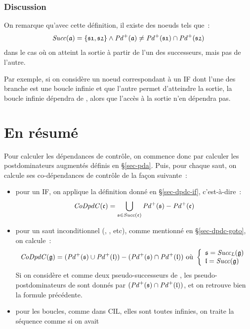 \subsubsection{Discussion}

On remarque qu'avec cette définition, il existe des noeuds  tels que~:
$$
\mathit{Succ}(\mathfrak{a}) = \{\mathfrak{s1}, \mathfrak{s2}\} \wedge \mathit{Pd}^{+}(\mathfrak{a}) \neq \mathit{Pd}^{+}(\mathfrak{s1}) \cap \mathit{Pd}^{+}(\mathfrak{s2})
$$
dans le cas où on atteint la sortie à partir de l'un des successeurs, mais pas
de l'autre.

Par exemple, si on considère un noeud  correspondant à un {\sc IF}
dont l'une des branche est une boucle infinie et que l'autre permet d'atteindre
la sortie, la boucle infinie dépendra de , alors que l'accès à la sortie
n'en dépendra pas.


\section{En résumé}

Pour calculer les dépendances de contrôle, on commence donc par calculer les
postdominateurs augmentés définis en \S\ref{sec-pda}.
Puis, pour chaque saut, on calcule ses co-dépendances de contrôle de la façon
suivante~:

\begin{itemize}
  \item pour un {\sc IF},
    on applique la définition donné en \S\ref{sec-dpdc-if},
    c'est-à-dire~:
$$
\mathit{CoDpdC}(\mathfrak{c}) = \bigcup_{ \mathfrak{s} \in \mathit{Succ}(\mathfrak{c})} \mathit{Pd}^{+}(\mathfrak{s}) - \mathit{Pd}^{+}(\mathfrak{c})
$$

  \item pour un saut inconditionnel (, , etc),
    comme mentionné en \S\ref{sec-dpdc-goto}, on calcule~:
$$
\mathit{CoDpdC}(\mathfrak{g}) = (\mathit{Pd}^{+}(\mathfrak{s}) \cup \mathit{Pd}^{+}(\mathfrak{l})) - (\mathit{Pd}^{+}(\mathfrak{s}) \cap \mathit{Pd}^{+}(\mathfrak{l}))
\mbox{  où } \left\{\begin{array}{l}
\mathfrak{s} = \mathit{Succ_{L}}(\mathfrak{g}) \\
\mathfrak{l} = \mathit{Succ}(\mathfrak{g})
\end{array}\right.
$$
Si on considère  et  comme deux pseudo-successeurs de ,
les pseudo-postdominateurs de  sont donnés par
$(\mathit{Pd}^{+}(\mathfrak{s}) \cap \mathit{Pd}^{+}(\mathfrak{l}))$, et on retrouve bien la formule précédente.

  \item pour les boucles, comme dans CIL, elles sont toutes infinies,
on traite la séquence 
comme si on avait 

\end{itemize}
